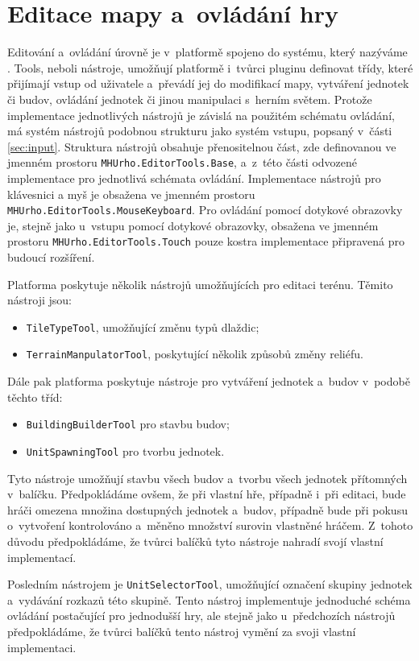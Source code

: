 \section{Editace mapy a~ovládání hry}
\label{sec:tools}
Editování a~ovládání úrovně je v~platformě spojeno do systému, který nazýváme . Tools, neboli nástroje, umožňují platformě i~tvůrci pluginu definovat třídy, které přijímají vstup od uživatele a~převádí jej do modifikací mapy, vytváření jednotek či budov, ovládání jednotek či jinou manipulaci s~herním světem. Protože implementace jednotlivých nástrojů je závislá na použitém schématu ovládání, má systém nástrojů podobnou strukturu jako systém vstupu, popsaný v~části \ref{sec:input}. Struktura nástrojů obsahuje přenositelnou část, zde definovanou ve jmenném prostoru \texttt{MHUrho.EditorTools.Base}, a~z~této části odvozené implementace pro jednotlivá schémata ovládání. Implementace nástrojů pro klávesnici a myš je obsažena ve jmenném prostoru \texttt{MHUrho.EditorTools.MouseKeyboard}. Pro ovládání pomocí dotykové obrazovky je, stejně jako u~vstupu pomocí dotykové obrazovky, obsažena ve jmenném prostoru \texttt{MHUrho.EditorTools.Touch} pouze kostra implementace připravená pro budoucí rozšíření.

Platforma poskytuje několik nástrojů umožňujících pro editaci terénu. Těmito nástroji jsou:
\begin{itemize}
	\item \texttt{TileTypeTool}, umožňující změnu typů dlaždic;
	\item \texttt{TerrainManpulatorTool}, poskytující několik způsobů změny reliéfu.
\end{itemize} 

Dále pak platforma poskytuje nástroje pro vytváření jednotek a~budov v~podobě těchto tříd:
\begin{itemize}
	\item \texttt{BuildingBuilderTool} pro stavbu budov;
	\item \texttt{UnitSpawningTool} pro tvorbu jednotek.
\end{itemize} 
Tyto nástroje umožňují stavbu všech budov a~tvorbu všech jednotek přítomných v~balíčku. Předpokládáme ovšem, že při vlastní hře, případně i~při editaci, bude hráči omezena množina dostupných jednotek a~budov, případně bude při pokusu o~vytvoření kontrolováno a~měněno množství surovin vlastněné hráčem. Z~tohoto důvodu předpokládáme, že tvůrci balíčků tyto nástroje nahradí svojí vlastní implementací.

Posledním nástrojem je \texttt{UnitSelectorTool}, umožňující označení skupiny jednotek a~vydávání rozkazů této skupině. Tento nástroj implementuje jednoduché schéma ovládání postačující pro jednodušší hry, ale stejně jako u~předchozích nástrojů předpokládáme, že tvůrci balíčků tento nástroj vymění za svoji vlastní implementaci.

